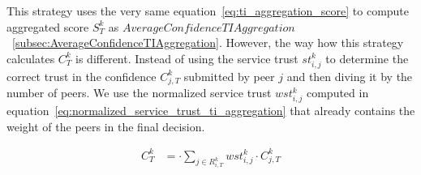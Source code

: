 This strategy uses the very same equation~\ref{eq:ti_aggregation_score} to compute aggregated score $S^{k}_{T}$ as $AverageConfidenceTIAggregation$~\ref{subsec:AverageConfidenceTIAggregation}.
However, the way how this strategy calculates $C^{k}_{T}$ is different. 
Instead of using the service trust $st^{k}_{i, j}$ to determine the correct trust in the confidence $C^{k}_{j, T}$ submitted by peer $j$ and then diving it by the number of peers.
We use the normalized service trust $wst^{k}_{i,j}$ computed in equation~\ref{eq:normalized_service_trust_ti_aggregation} that already contains the weight of the peers in the final decision.

\begin{equation}
\begin{split}
    C^{k}_{T} &= \cdot \sum_{{j}\in R^{k}_{i, T}} wst^{k}_{i,j} \cdot C^{k}_{j, T}
\end{split}
\end{equation}